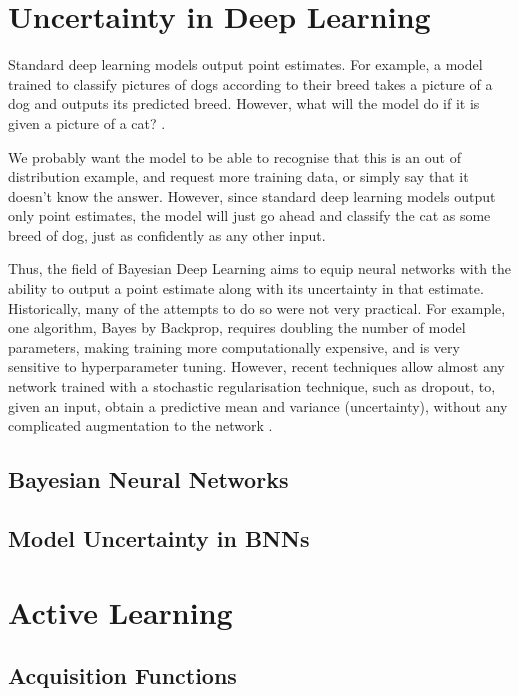 \documentclass[11pt, a4paper, bibliography=totoc]{report}
\begin{document}
\chapter{Uncertainty in Deep Learning}
Standard deep learning models output point estimates. For example, a model trained to classify pictures of dogs according to their breed takes a picture of a dog and outputs its predicted breed. However, what will the model do if it is given a picture of a cat? \cite{Gal2017a}.

We probably want the model to be able to recognise that this is an out of distribution example, and request more training data, or simply say that it doesn't know the answer. However, since standard deep learning models output only point estimates, the model will just go ahead and classify the cat as some breed of dog, just as confidently as any other input.

Thus, the field of Bayesian Deep Learning aims to equip neural networks with the ability to output a point estimate along with its uncertainty in that estimate. Historically, many of the attempts to do so were not very practical. For example, one algorithm, Bayes by Backprop, requires doubling the number of model parameters, making training more computationally expensive, and is very sensitive to hyperparameter tuning. However, recent techniques allow almost any network trained with a stochastic regularisation technique, such as dropout, to, given an input, obtain a predictive mean and variance (uncertainty), without any complicated augmentation to the network \cite[p.~15]{Gal2017a}.

\section{Bayesian Neural Networks}

\section{Model Uncertainty in BNNs}

\chapter{Active Learning}
\section{Acquisition Functions}
\end{document}
